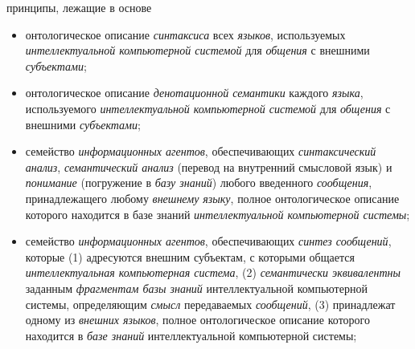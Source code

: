 \begin{SCn}
\begin{scnrelfromlistcustom}{принципы, лежащие в основе}
{\begin{itemize}[labelsep=\tabsize-\bulletsize,leftmargin=\tabsize,label=$\bullet$]
				\item онтологическое описание \textit{синтаксиса} всех \textit{языков}, используемых \textit{интеллектуальной компьютерной системой} для \textit{общения} с внешними \textit{субъектами};
				\item онтологическое описание \textit{денотационной семантики} каждого \textit{языка}, используемого \textit{интеллектуальной компьютерной системой} для \textit{общения} с внешними \textit{субъектами};
				\item семейство \textit{информационных агентов}, обеспечивающих \textit{синтаксический анализ}, \textit{семантический анализ} (перевод на внутренний смысловой язык) и \textit{понимание} (погружение в \textit{базу знаний}) любого введенного \textit{сообщения}, принадлежащего любому \textit{внешнему языку}, полное онтологическое описание которого находится в базе знаний \textit{интеллектуальной компьютерной системы};
				\item семейство \textit{информационных агентов}, обеспечивающих \textit{синтез сообщений}, которые (1) адресуются внешним субъектам, с которыми общается \textit{интеллектуальная компьютерная система}, (2) \textit{семантически эквивалентны} заданным \textit{фрагментам базы знаний} интеллектуальной компьютерной системы, определяющим \textit{смысл} передаваемых \textit{сообщений}, (3) принадлежат одному из \textit{внешних языков}, полное онтологическое описание которого находится в \textit{базе знаний} интеллектуальной компьютерной системы; 
			\end{itemize}
		}
		

\end{scnrelfromlistcustom}
\end{SCn}
